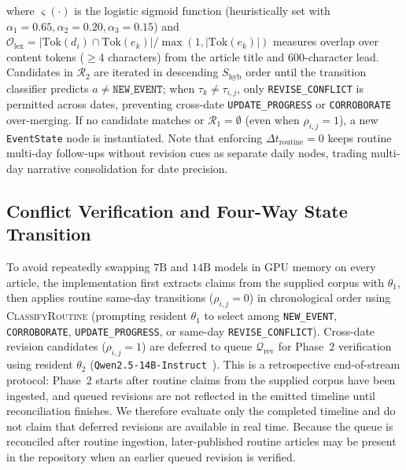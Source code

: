 \documentclass[journal]{IEEEtran}
\begin{document}
where $\varsigma(\cdot)$ is the logistic sigmoid function (heuristically set with $\alpha_1=0.65, \alpha_2=0.20, \alpha_3=0.15$) and $\mathcal{O}_{\text{lex}} = |\text{Tok}(d_i)\cap\text{Tok}(e_k)| / \max(1, |\text{Tok}(e_k)|)$ measures overlap over content tokens ($\ge 4$ characters) from the article title and 600-character lead. Candidates in $\mathcal{R}_2$ are iterated in descending $S_{\text{hyb}}$ order until the transition classifier predicts $a \neq \texttt{NEW\_EVENT}$; when $\tau_k \neq \tau_{i,j}$, only \texttt{REVISE\_CONFLICT} is permitted across dates, preventing cross-date \texttt{UPDATE\_PROGRESS} or \texttt{CORROBORATE} over-merging. If no candidate matches or $\mathcal{R}_1 = \emptyset$ (even when $\rho_{i,j}=1$), a new \texttt{EventState} node is instantiated. Note that enforcing $\Delta t_{\text{routine}}=0$ keeps routine multi-day follow-ups without revision cues as separate daily nodes, trading multi-day narrative consolidation for date precision.

\subsection{Conflict Verification and Four-Way State Transition}
\label{subsec:verification}

To avoid repeatedly swapping $7\text{B}$ and $14\text{B}$ models in GPU memory on every article, the implementation first extracts claims from the supplied corpus with $\theta_1$, then applies routine same-day transitions ($\rho_{i,j}=0$) in chronological order using \textsc{ClassifyRoutine} (prompting resident $\theta_1$ to select among \texttt{NEW\_EVENT}, \texttt{CORROBORATE}, \texttt{UPDATE\_PROGRESS}, or same-day \texttt{REVISE\_CONFLICT}). Cross-date revision candidates ($\rho_{i,j}=1$) are deferred to queue $\mathcal{Q}_{\text{rev}}$ for Phase~2 verification using resident $\theta_2$ (\texttt{Qwen2.5-14B-Instruct}~\cite{qwen25}). This is a retrospective end-of-stream protocol: Phase~2 starts after routine claims from the supplied corpus have been ingested, and queued revisions are not reflected in the emitted timeline until reconciliation finishes. We therefore evaluate only the completed timeline and do not claim that deferred revisions are available in real time. Because the queue is reconciled after routine ingestion, later-published routine articles may be present in the repository when an earlier queued revision is verified.
\end{document}

